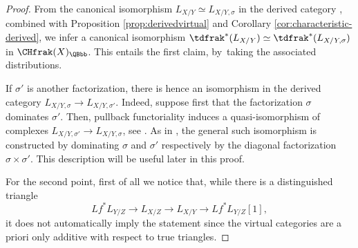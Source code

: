 \begin{proof}
From the canonical isomorphism $L_{X/Y}\simeq L_{X/Y,\sigma}$ in the derived category \cite[\href{https://stacks.math.columbia.edu/tag/08TJ}{08TJ}]{stacks-project}, combined with Proposition \ref{prop:derivedvirtual} and Corollary \ref{cor:characteristic-derived}, we infer a canonical isomorphism
$\tdfrak^{\ast}(L_{X/Y})\simeq \tdfrak^{\ast}(L_{X/Y,\sigma})$ in $\CHfrak(X)_{\QBbb}$. This entails the first claim, by~taking the associated distributions.

If $\sigma'$ is another factorization, there is hence an isomorphism in the derived category $L_{X/Y, \sigma} \to L_{X/Y, \sigma'}$. Indeed, suppose first that the factorization $\sigma$ dominates $\sigma'$. Then, pullback functoriality induces a quasi-isomorphism of complexes $L_{X/Y, \sigma'} \to L_{X/Y, \sigma}$, see \cite[Exp.\,VIII, proof of Prop.\,2.2]{SGA6}. As in \loccit, the general such isomorphism is constructed by dominating $\sigma$ and $\sigma'$ respectively by the diagonal factorization $\sigma \times \sigma'$. This description will be useful later in this proof.

For the second point, first of all we notice that, while there is a distinguished triangle
\begin{displaymath}
Lf^\ast L_{Y/Z} \to L_{X/Z} \to L_{X/Y} \to Lf^\ast L_{Y/Z}[1],
\end{displaymath}
it does not automatically imply the statement since the virtual categories are a priori only additive with respect to true triangles.


\end{proof}
